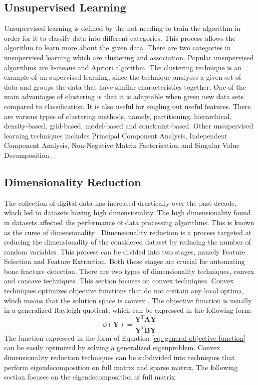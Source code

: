 \documentclass[11pt,twocolumn]{witseiepaper}
\begin{document}
	\subsection{\textbf{Unsupervised Learning}}
	Unsupervised learning is defined by the not needing to train the algorithm in order for it to classify data into different categories. This process allows the algorithm to learn more about the given data. There are two categories in unsupervised learning which are clustering and association. Popular unsupervised algorithms are k-means and Apriori algorithm. The clustering technique is an example of un-supervised learning, since the technique analyses a given set of data and groups the data that have similar characteristics together. One of the main advantages of clustering is that it is adaptable when given new data sets compared to classification. It is also useful for singling out useful features. There are various types of clustering methods, namely, partitioning, hierarchical, density-based, grid-based, model-based and constraint-based. Other unsupervised learning techniques includes Principal Component Analysis, Independent Component Analysis, Non-Negative Matrix Factorization and Singular Value Decomposition. 
	
	\subsection{\textbf{Dimensionality Reduction}}
	The collection of digital data has increased drastically over the past decade, which led to datasets having high dimensionality. The high dimensionality found in datasets affected the performance of data processing algorithms. This is known as the curse of dimensionality \cite{Center2002}. Dimensionality reduction is a process targeted at reducing the dimensionality of the considered dataset by reducing the number of random variables. This process can be divided into two stages, namely Feature Selection and Feature Extraction. Both these stages are crucial for automating bone fracture detection. There are two types of dimensionality techniques, convex and concave techniques. This section focuses on convex techniques. Convex techniques optimizes objective functions that do not contain any local optima, which means that the solution space is convex \cite{Boyd2010}. The objective function is usually in a generalized Rayleigh quotient, which can be expressed in the following form: 
	\begin{equation}
		\phi(\textbf{Y}) = \frac{\textbf{Y}^{T}\textbf{AY}}{\textbf{Y}^{T}\textbf{BY}}
		\label{eq: general objective function}
	\end{equation}
	The function expressed in the form of Equation \ref{eq: general objective function} can be easily optimized by solving a generalized eigenproblem. Convex dimensionality reduction techniques can be subdivided into techniques that perform eigendecomposition on full matrix and sparse matrix. The following section focuses on the eigendecomposition of full matrix. 
	
\end{document}
